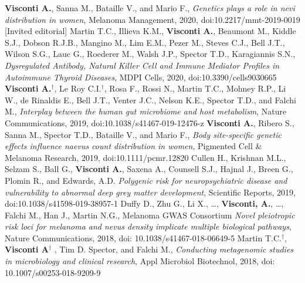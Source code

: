 \documentclass[a4paper,10pt]{article}
\begin{document}
{\begin{itemize}
		 \textbf{Visconti A.}, Sanna M., Bataille V., and Mario F., \emph{Genetics plays a role in nevi distribution in women}, Melanoma Management, 2020, doi:10.2217/mmt-2019-0019 [Invited editorial]
		 Martin T.C., Illieva K.M., \textbf{Visconti A.}, Beaumont M., Kiddle S.J., Dobson R.J.B., Mangino M., Lim E.M., Pezer M., Steves C.J., Bell J.T., Wilson S.G., Lauc G., Roederer M., Walsh J.P., Spector T.D., Karagiannis S.N., \emph{Dysregulated Antibody, Natural Killer Cell and Immune Mediator Profiles in Autoimmune Thyroid Diseases}, MDPI Cells, 2020, doi:10.3390/cells9030665
		 \textbf{Visconti A.}$^{\textbf{$\dag $}}$, Le Roy C.I.$^{\textbf{$\dag $}}$, Rosa F., Rossi N., Martin T.C., Mohney R.P., Li W., de Rinaldis E., Bell J.T., Venter J.C., Nelson K.E., Spector T.D., and Falchi M., \emph{Interplay between the human gut microbiome and host metabolism}, Nature Communications, 2019, doi:10.1038/s41467-019-12476-z
		 \textbf{Visconti A.}, Ribero S., Sanna M., Spector T.D., Bataille V., and Mario F., \emph{Body site-specific genetic effects influence naevus count distribution in women}, Pigmented Cell \& Melanoma Research, 2019, doi:10.1111/pcmr.12820
		 Cullen H., Krishnan M.L., Selzam S., Ball G., \textbf{Visconti A.}, Saxena A., Counsell S.J., Hajnal J., Breen G., Plomin R., and Edwards, A.D. \emph{Polygenic risk for neuropsychiatric disease and vulnerability to abnormal deep grey matter development}, Scientific Reports, 2019, doi:10.1038/s41598-019-38957-1
		 Duffy D., Zhu G., Li X., \dots, \textbf{Visconti, A.}, \dots, Falchi M., Han J., Martin N.G., Melanoma GWAS Consortium \emph{Novel pleiotropic risk loci for melanoma and nevus density implicate multiple biological pathways}, Nature Communications, 2018, doi: 10.1038/s41467-018-06649-5		
		 Martin T.C.$^{\textbf{$\dag $}}$, \textbf{Visconti A}$^{\textbf{$\dag $}}$ , Tim D. Spector, and Falchi M., \emph{Conducting metagenomic studies in microbiology and clinical research}, Appl Microbiol Biotechnol, 2018, doi: 10.1007/s00253-018-9209-9
		
		
		
	\end{itemize}
}
\end{document}
